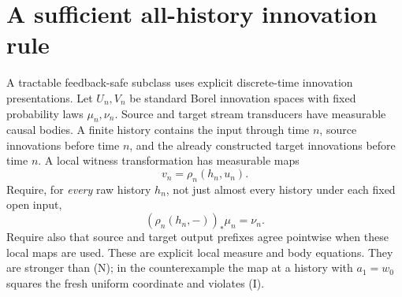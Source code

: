 \documentclass[11pt]{article}
\begin{document}
\section{A sufficient all-history innovation rule}
A tractable feedback-safe subclass uses explicit discrete-time innovation presentations. Let $U_n,V_n$ be standard Borel innovation spaces with fixed probability laws $\mu_n,\nu_n$. Source and target stream transducers have measurable causal bodies. A finite history contains the input through time $n$, source innovations before time $n$, and the already constructed target innovations before time $n$. A local witness transformation has measurable maps
\[
 v_n=\rho_n(h_n,u_n).
\]
Require, for \emph{every} raw history $h_n$, not just almost every history under each fixed open input,
\[
 (\rho_n(h_n,-))_*\mu_n=\nu_n.\tag{I}
\]
Require also that source and target output prefixes agree pointwise when these local maps are used. These are explicit local measure and body equations. They are stronger than (N); in the counterexample the map at a history with $a_1=w_0$ squares the fresh uniform coordinate and violates (I).
\end{document}
